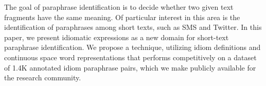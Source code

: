 The goal of paraphrase identification is to decide whether two given text fragments have the same meaning. Of particular interest in this area is the identification of paraphrases among short texts, such as SMS and Twitter. In this paper, we present idiomatic expressions as a new domain for short-text paraphrase identification. We propose a technique, utilizing idiom definitions and continuous space word representations that performs competitively on a dataset of 1.4K annotated idiom paraphrase pairs, which we make publicly available for the research community.
